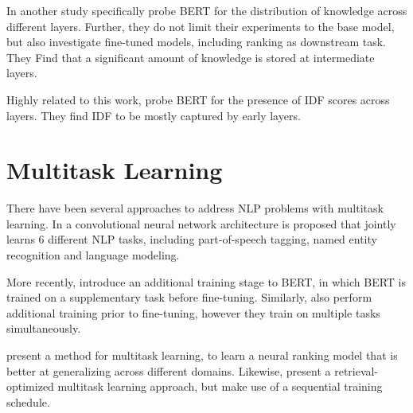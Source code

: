 In another study \cite{singh-etal-2020-bertnesia} specifically probe BERT for the distribution of knowledge across different layers. Further, they do not limit their experiments to the base model, but also investigate fine-tuned models, including ranking as downstream task. They Find that a significant amount of knowledge is stored at intermediate layers.

Highly related to this work, \cite{https://doi.org/10.48550/arxiv.2202.12191} probe BERT for the presence of IDF scores across layers. They find IDF to be mostly captured by early layers.

\section{Multitask Learning}
There have been several approaches to address NLP problems with multitask learning. In \cite{10.1145/1390156.1390177} a convolutional neural network architecture is proposed that jointly learns 6 different NLP tasks, including part-of-speech tagging, named entity recognition and language modeling.

More recently, \cite{DBLP:journals/corr/abs-1811-01088} introduce an additional training stage to BERT, in which BERT is trained on a supplementary task before fine-tuning. Similarly, \cite{DBLP:journals/corr/abs-1901-11504} also perform additional training prior to fine-tuning, however they train on multiple tasks simultaneously.

\cite{maillard-etal-2021-multi} present a method for multitask learning, to learn a neural ranking model that is better at generalizing across different domains. Likewise, \cite{Fun2021EfficientRO} present a retrieval-optimized multitask learning approach, but make use of a sequential training schedule.